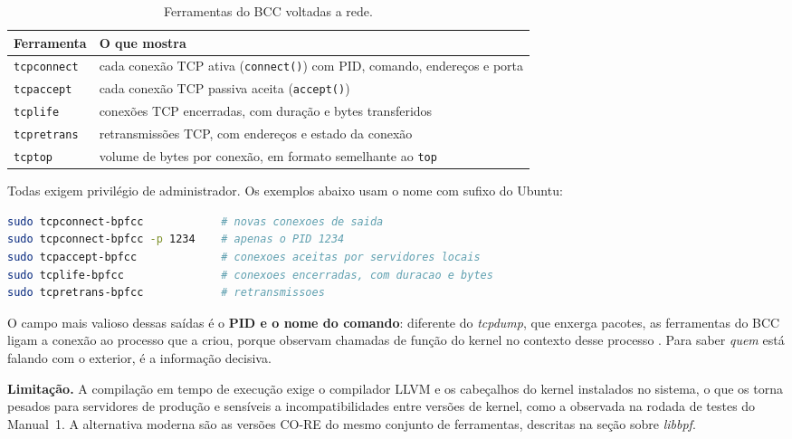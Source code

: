 \begin{table}[h]
\centering
\caption{Ferramentas do BCC voltadas a rede.}
\label{tab:bcc-rede}
\begin{tabular}{P{2.8cm} P{10.6cm}}
\hline
\textbf{Ferramenta} & \textbf{O que mostra} \\
\hline
\texttt{tcpconnect} & cada conexão TCP ativa (\texttt{connect()}) com PID, comando, endereços e porta \\
\texttt{tcpaccept} & cada conexão TCP passiva aceita (\texttt{accept()}) \\
\texttt{tcplife} & conexões TCP encerradas, com duração e bytes transferidos \\
\texttt{tcpretrans} & retransmissões TCP, com endereços e estado da conexão \\
\texttt{tcptop} & volume de bytes por conexão, em formato semelhante ao \texttt{top} \\
\hline
\end{tabular}
\end{table}

Todas exigem privilégio de administrador. Os exemplos abaixo usam o nome com sufixo
do Ubuntu:

\begin{lstlisting}[language=bash, caption={Ferramentas de rede do BCC.}, label=lst:ferr-bcc]
sudo tcpconnect-bpfcc            # novas conexoes de saida
sudo tcpconnect-bpfcc -p 1234    # apenas o PID 1234
sudo tcpaccept-bpfcc             # conexoes aceitas por servidores locais
sudo tcplife-bpfcc               # conexoes encerradas, com duracao e bytes
sudo tcpretrans-bpfcc            # retransmissoes
\end{lstlisting}

O campo mais valioso dessas saídas é o \textbf{PID e o nome do comando}: diferente do
\textit{tcpdump}, que enxerga pacotes, as ferramentas do BCC ligam a conexão ao
processo que a criou, porque observam chamadas de função do kernel no contexto desse
processo \cite{gregg2019}. Para saber \textit{quem} está falando com o exterior, é a
informação decisiva.

\textbf{Limitação.} A compilação em tempo de execução exige o compilador LLVM e os
cabeçalhos do kernel instalados no sistema, o que os torna pesados para servidores de
produção e sensíveis a incompatibilidades entre versões de kernel, como a observada na
rodada de testes do Manual~1. A alternativa moderna são as versões CO-RE do mesmo
conjunto de ferramentas, descritas na seção sobre \textit{libbpf}.

